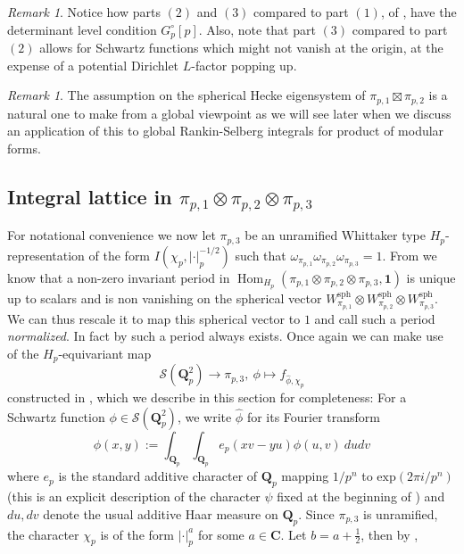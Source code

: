 \documentclass{amsart}%
\theoremstyle{plain}
\theoremstyle{plain}
\theoremstyle{remark}
\newtheorem{rem}[thm]{Remark}
\DeclareMathOperator{\Hom}{Hom}
\begin{document}
\begin{rem}
    Notice how parts $(2)$ and $(3)$ compared to part $(1)$, of , have the determinant level condition $G_p^\circ[p]$. Also, note that part $(3)$  compared to part $(2)$ allows for Schwartz functions which might not vanish at the origin, at the expense of a potential Dirichlet $L$-factor popping up.
\end{rem}
\begin{rem}
    The assumption on the spherical Hecke eigensystem of $\pi_{p,1}\boxtimes \pi_{p,2}$ is a natural one to make from a global viewpoint as we will see later when we discuss an application of this to global Rankin-Selberg integrals for product of modular forms.
    \end{rem}
\noindent 
\subsection{Integral lattice in $\pi_{p,1}\otimes \pi_{p,2}\otimes \pi_{p,3}$}\label{sec integral lattice in pi1 x pi2 x pi3}
For notational convenience we now let $\pi_{p,3}$ be an unramified Whittaker type $H_p$-representation of the form $I(\chi_p,|\cdot|_p^{-1/2})$ such that $\omega_{\pi_{p,1}}\omega_{\pi_{p,2}}\omega_{\pi_{p,3}}=1$. From  we know that a non-zero invariant period in $\Hom_{H_p}(\pi_{p,1}\otimes \pi_{p,2}\otimes \pi_{p,3},\mathbf{1})$ is unique up to scalars and is non vanishing on the spherical vector $W_{\pi_{p,1}}^\mathrm{sph}\otimes W_{\pi_{p,2}}^\mathrm{sph}\otimes W_{\pi_{p,3}}^\mathrm{sph}$. We can thus rescale it to map this spherical vector to $1$ and call such a period \textit{normalized}. In fact by \cite{harris2001note} such a period always exists. Once again we can make use of the $H_p$-equivariant map $$\mathcal{S}(\mathbf{Q}_p^2)\rightarrow \pi_{p,3},\ \phi\mapsto f_{\hat{\phi},\chi_p}$$ constructed in \cite{Loeffler_Skinner_Zerbes_2021}, which we describe in this section for completeness: For a Schwartz function $\phi\in\mathcal{S}(\mathbf{Q}_p^2)$, we write $\hat{\phi}$ for its Fourier transform 
$$\hat{\phi}(x,y):=\int_{\mathbf{Q}_p}\int_{\mathbf{Q}_p}e_p(xv-yu)\phi(u,v)\ dudv$$
where $e_p$ is the standard additive character of $\mathbf{Q}_p$ mapping $1/p^n$ to $\mathrm{exp}(2\pi i/p^n)$ (this is an explicit description of the character $\psi$ fixed at the beginning of ) and $du, dv$ denote the usual additive Haar measure on $\mathbf{Q}_p$. Since $\pi_{p,3}$ is unramified, the character $\chi_p$ is of the form $|\cdot|_p^a$ for some $a\in\mathbf{C}$. Let $b=a+\tfrac{1}{2}$, then by \cite[Proposition $3.2.2$]{Loeffler_Skinner_Zerbes_2021},
\end{document}
